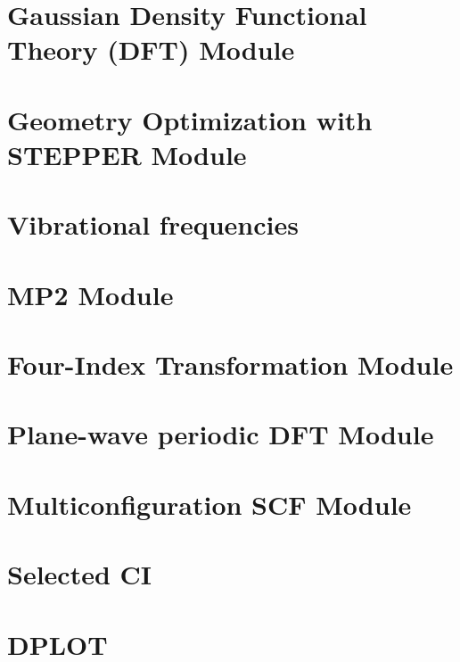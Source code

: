 

\section{Gaussian Density Functional Theory (DFT) Module}


\section{Geometry Optimization with STEPPER Module}

\section{Vibrational frequencies}


\section{MP2 Module}


\section{Four-Index Transformation Module} 


\section{Plane-wave periodic DFT Module}


\section{Multiconfiguration SCF Module}


\section{Selected CI}




\section{DPLOT}


